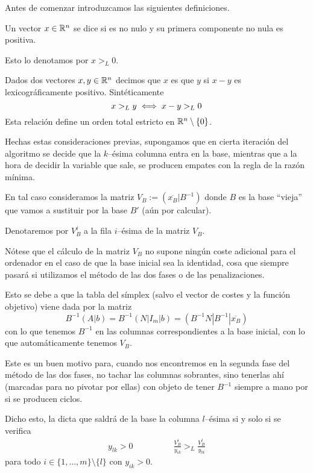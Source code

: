Antes de comenzar introduzcamos las siguientes definiciones.
\begin{defi}
	Un vector $x\in\mathbb{R}^n$ se dice  si es no nulo y su primera componente no nula es positiva.
	
	Esto lo denotamos por $x>_L0$.
\end{defi}
\begin{defi}
	Dados dos vectores $x,y\in\mathbb{R}^n$ decimos que $x$ es  que $y$ si $x-y$ es lexicográficamente positivo. Sintéticamente
	\begin{equation*}
		x>_Ly\iff x-y>_L0
	\end{equation*}
	Esta relación define un orden total estricto en $\mathbb{R}^n\setminus\{0\}$.
\end{defi}
Hechas estas consideraciones previas, supongamos que en cierta iteración del algoritmo se decide que la $k$--ésima columna entra en la base, mientras que a la hora de decidir la variable que sale, se producen empates con la regla de la razón mínima.

En tal caso consideramos la matriz $V_B:=(\overline{x_B}|B^{-1})$ donde $B$ es la base ``vieja'' que vamos a sustituir por la base $B'$ (aún por calcular).

Denotaremos por $V_B^i$ a la fila $i$--ésima de la matriz $V_B$.
\begin{obs}[Cálculo de $V_B$]
	Nótese que el cálculo de la matriz $V_B$ no supone ningún coste adicional para el ordenador en el caso de que la base inicial sea la identidad, cosa que siempre pasará si utilizamos el método de las dos fases o de las penalizaciones.

	Esto se debe a que la tabla del símplex (salvo el vector de costes y la función objetivo) viene dada por la matriz
	\begin{equation*}
		B^{-1}(A|b)=B^{-1}(N|I_m|b)=(B^{-1}N|B^{-1}|\overline{x_B})
	\end{equation*}
	con lo que tenemos $B^{-1}$ en las columnas correspondientes a la base inicial, con lo que automáticamente tenemos $V_B$.
	
	Este es un buen motivo para, cuando nos encontremos en la segunda fase del método de las dos fases, no tachar las columnas sobrantes, sino tenerlas ahí (marcadas para no pivotar por ellas) con objeto de tener $B^{-1}$ siempre a mano por si se producen ciclos.
\end{obs}
Dicho esto, la  dicta que saldrá de la base la columna $l$--ésima si y solo si se verifica
\begin{equation}
\label{simp_eq_lexico}
	\begin{array}{cc}
		y_{lk}>0 \qquad&\qquad \displaystyle{\frac{V_B^i}{y_{ik}}>_L\frac{V_B^l}{y_{lk}}}
	\end{array}
\end{equation}
para todo $i\in\{1,\dots,m\}\setminus\{l\}$ con $y_{ik}>0$.

